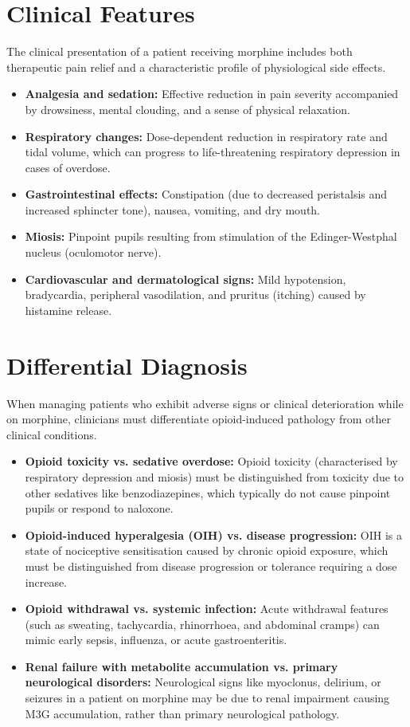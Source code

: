 \section*{Clinical Features}
The clinical presentation of a patient receiving morphine includes both therapeutic pain relief and a characteristic profile of physiological side effects.
\begin{itemize}
    \item \textbf{Analgesia and sedation:} Effective reduction in pain severity accompanied by drowsiness, mental clouding, and a sense of physical relaxation.
    \item \textbf{Respiratory changes:} Dose-dependent reduction in respiratory rate and tidal volume, which can progress to life-threatening respiratory depression in cases of overdose.
    \item \textbf{Gastrointestinal effects:} Constipation (due to decreased peristalsis and increased sphincter tone), nausea, vomiting, and dry mouth.
    \item \textbf{Miosis:} Pinpoint pupils resulting from stimulation of the Edinger-Westphal nucleus (oculomotor nerve).
    \item \textbf{Cardiovascular and dermatological signs:} Mild hypotension, bradycardia, peripheral vasodilation, and pruritus (itching) caused by histamine release.
\end{itemize}

\section*{Differential Diagnosis}
When managing patients who exhibit adverse signs or clinical deterioration while on morphine, clinicians must differentiate opioid-induced pathology from other clinical conditions.
\begin{itemize}
    \item \textbf{Opioid toxicity vs. sedative overdose:} Opioid toxicity (characterised by respiratory depression and miosis) must be distinguished from toxicity due to other sedatives like benzodiazepines, which typically do not cause pinpoint pupils or respond to naloxone.
    \item \textbf{Opioid-induced hyperalgesia (OIH) vs. disease progression:} OIH is a state of nociceptive sensitisation caused by chronic opioid exposure, which must be distinguished from disease progression or tolerance requiring a dose increase.
    \item \textbf{Opioid withdrawal vs. systemic infection:} Acute withdrawal features (such as sweating, tachycardia, rhinorrhoea, and abdominal cramps) can mimic early sepsis, influenza, or acute gastroenteritis.
    \item \textbf{Renal failure with metabolite accumulation vs. primary neurological disorders:} Neurological signs like myoclonus, delirium, or seizures in a patient on morphine may be due to renal impairment causing M3G accumulation, rather than primary neurological pathology.
\end{itemize}

